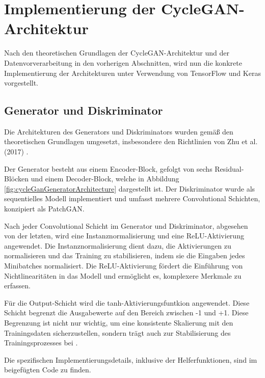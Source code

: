 \section{Implementierung der CycleGAN-Architektur}
Nach den theoretischen Grundlagen der CycleGAN-Architektur und der Datenvorverarbeitung in den vorherigen Abschnitten, wird nun die konkrete Implementierung der Architekturen unter Verwendung von TensorFlow und Keras vorgestellt.

\subsection{Generator und Diskriminator}
Die Architekturen des Generators und Diskriminators wurden gemäß den theoretischen Grundlagen umgesetzt, insbesondere den Richtlinien von Zhu et al. (2017) \cite{Zhu.2017}. 

Der Generator besteht aus einem Encoder-Block, gefolgt von sechs Residual-\\Blöcken und einem Decoder-Block, welche in Abbildung \ref{fig:cycleGanGeneratorArchitecture} dargestellt ist.
Der Diskriminator wurde als sequentielles Modell implementiert und umfasst mehrere Convolutional Schichten, konzipiert als PatchGAN.

Nach jeder Convolutional Schicht im Generator und Diskriminator, abgesehen von der letzten, wird eine Instanznormalisierung und eine ReLU-Aktivierung angewendet. 
Die Instanznormalisierung dient dazu, die Aktivierungen zu normalisieren und das Training zu stabilisieren, indem sie die Eingaben jedes Minibatches normalisiert. Die ReLU-Aktivierung fördert die Einführung von Nichtlinearitäten in das Modell und ermöglicht es, komplexere Merkmale zu erfassen.

Für die Output-Schicht wird die tanh-Aktivierungsfuntkion angewendet. Diese Schicht begrenzt die Ausgabewerte auf den Bereich zwischen -1 und +1. Diese Begrenzung ist nicht nur wichtig, um eine konsistente Skalierung mit den Trainingsdaten sicherzustellen, sondern trägt auch zur Stabilisierung des Trainingsprozesses bei \cite{Radford.2015}.

Die spezifischen Implementierungsdetails, inklusive der Helferfunktionen, sind im beigefügten Code zu finden.

\newpage

\newpage




